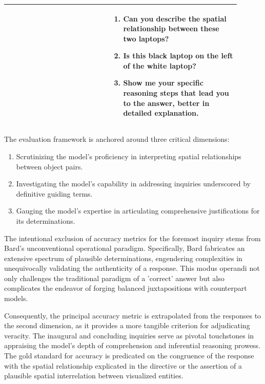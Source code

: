 \documentclass[journal,10pt]{IEEEtran}
\begin{document}
\begin{table}[ht]
\begin{tabular}{|p{0.4\linewidth}|p{0.5\linewidth}|}
        & \begin{enumerate}
            \item Can you describe the spatial relationship between these two laptops?
            \item Is this black laptop on the left of the white laptop?
            \item Show me your specific reasoning steps that lead you to the answer, better in detailed explanation.
        \end{enumerate}\\
        \hline
        \end{tabular}
\end{table}

The evaluation framework is anchored around three critical dimensions:
\begin{enumerate}
\item Scrutinizing the model's proficiency in interpreting spatial relationships between object pairs.
\item Investigating the model's capability in addressing inquiries underscored by definitive guiding terms.
\item Gauging the model's expertise in articulating comprehensive justifications for its determinations.
\end{enumerate}
The intentional exclusion of accuracy metrics for the foremost inquiry stems from Bard's unconventional operational paradigm. Specifically, Bard fabricates an extensive spectrum of plausible determinations, engendering complexities in unequivocally validating the authenticity of a response. This modus operandi not only challenges the traditional paradigm of a 'correct' answer but also complicates the endeavor of forging balanced juxtapositions with counterpart models.

Consequently, the principal accuracy metric is extrapolated from the responses to the second dimension, as it provides a more tangible criterion for adjudicating veracity. The inaugural and concluding inquiries serve as pivotal touchstones in appraising the model's depth of comprehension and inferential reasoning prowess. The gold standard for accuracy is predicated on the congruence of the response with the spatial relationship explicated in the directive or the assertion of a plausible spatial interrelation between visualized entities.
\end{document}

